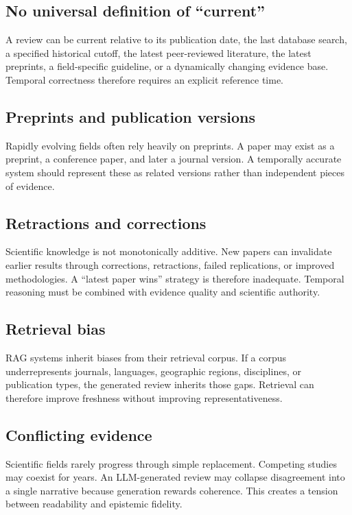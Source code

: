 \documentclass[manuscript,screen]{acmart}
\begin{document}
\subsection{No universal definition of ``current''}\label{subsec:current}
A review can be current relative to its publication date, the last database search, a specified historical cutoff,
the latest peer-reviewed literature, the latest preprints, a field-specific guideline, or a dynamically changing
evidence base. Temporal correctness therefore requires an explicit reference time.

\subsection{Preprints and publication versions}\label{subsec:versions}
Rapidly evolving fields often rely heavily on preprints. A paper may exist as a preprint, a conference paper,
and later a journal version. A temporally accurate system should represent these as related versions rather
than independent pieces of evidence.

\subsection{Retractions and corrections}\label{subsec:retractions}
Scientific knowledge is not monotonically additive. New papers can invalidate earlier results through corrections,
retractions, failed replications, or improved methodologies. A ``latest paper wins'' strategy is therefore
inadequate. Temporal reasoning must be combined with evidence quality and scientific authority.

\subsection{Retrieval bias}\label{subsec:retrieval-bias}
RAG systems inherit biases from their retrieval corpus. If a corpus underrepresents journals, languages,
geographic regions, disciplines, or publication types, the generated review inherits those gaps. Retrieval can
therefore improve freshness without improving representativeness.

\subsection{Conflicting evidence}\label{subsec:conflicting-evidence}
Scientific fields rarely progress through simple replacement. Competing studies may coexist for years. An
LLM-generated review may collapse disagreement into a single narrative because generation rewards coherence.
This creates a tension between readability and epistemic fidelity.
\end{document}
